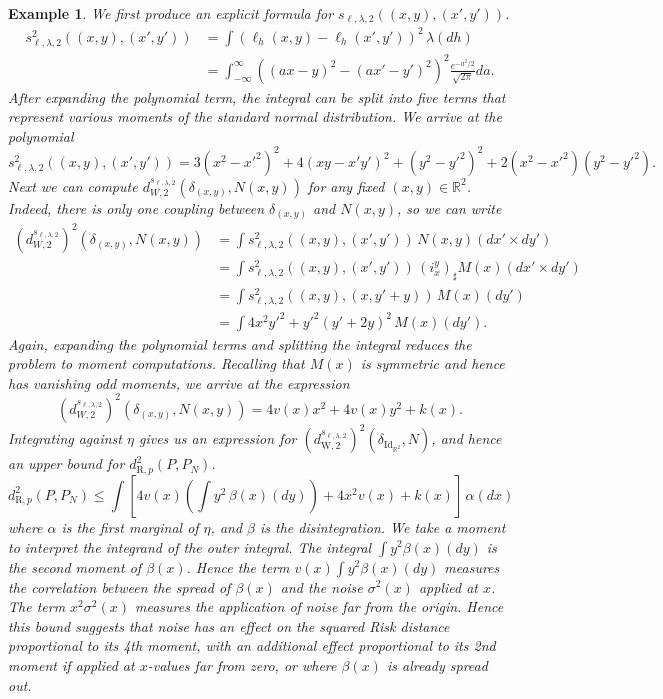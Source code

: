 \documentclass[twoside,11pt]{article}
\newtheorem{examples}[theorem]{Example}
\DeclareMathOperator{\id}{Id}
\newcommand{\dexp}[1][]{d_{\mathrm{R}#1}}
\newcommand{\dWkernp}[1]{d_{\mathrm{W},#1}}
\begin{document}
\begin{examples}
    We first produce an explicit formula for $s_{\ell,\lambda,2}((x,y),(x',y'))$.
    \begin{align*}
    s_{\ell,\lambda,2}^2((x,y),(x',y'))
    & =
    \int\left(
        \ell_h(x,y) - \ell_h(x',y')
    \right)^2 \, \lambda(dh)
    \\ & =
    \int_{-\infty}^\infty\left(
        (ax-y)^2 - (ax'-y')^2
    \right)^2 \frac{e^{-a^2/2}}{\sqrt{2\pi}} da.
    \end{align*}
    After expanding the polynomial term, the integral can be split into five terms that represent various moments of the standard normal distribution. We arrive at the polynomial
    \[
    s_{\ell,\lambda,2}^2((x,y),(x',y')) = 3(x^2-x'^2)^2 + 4(xy-x'y')^2 + (y^2-y'^2)^2 + 2(x^2-x'^2)(y^2-y'^2).
    \]
    Next we can compute $d_{W,2}^{s_{\ell,\lambda,2}}(\delta_{(x,y)}, N(x,y))$ for any fixed $(x,y) \in \mathbb R^2$. Indeed, there is only one coupling between $\delta_{(x,y)}$ and  $N(x,y)$, so we can write
    \begin{align*}
    \left(d_{W,2}^{s_{\ell,\lambda,2}}\right)^2(\delta_{(x,y)}, N(x,y))
    & =
    \int s_{\ell,\lambda,2}^2((x,y),(x',y'))\, N(x,y)(dx'{\times}dy')
    \\ & =
    \int s_{\ell,\lambda,2}^2((x,y),(x',y'))\, (i_x^y)_\sharp M(x)(dx'{\times}dy')
    \\ & =
    \int s_{\ell,\lambda,2}^2((x,y),(x,y'+y))\, M(x)(dy')
    \\ & =
    \int 4x^2y'^2 + y'^2(y'+2y)^2\, M(x)(dy').
    \end{align*}
    Again, expanding the polynomial terms and splitting the integral reduces the problem to moment computations. Recalling that $M(x)$ is symmetric and hence has vanishing odd moments, we arrive at the expression
    \[
    \left(d_{W,2}^{s_{\ell,\lambda,2}}\right)^2(\delta_{(x,y)}, N(x,y)) = 4v(x)x^2+ 4v(x)y^2 + k(x).
    \]
    Integrating against $\eta$ gives us an expression for $\left(\dWkernp{2}^{s_{\ell,\lambda,2}}\right)^2(\delta_{\id_{\mathbb R^2}},N)$, and hence an upper bound for $\dexp[,p]^2(P,P_N)$.
    \[
    \dexp[,p]^2(P,P_N) \leq \int \left[4 v(x) \left(\int y^2 \, \beta(x)(dy)\right)  + 4 x^2v(x) + k(x) \right]\, \alpha(dx)
    \]
    where $\alpha$ is the first marginal of $\eta$, and $\beta$ is the disintegration. We take a moment to interpret the integrand of the outer integral. The integral $\int y^2 \beta(x)(dy)$ is the second moment of $\beta(x)$. Hence the term $v(x)\int y^2 \beta(x)(dy)$ measures the correlation between the spread of $\beta(x)$ and the noise $\sigma^2(x)$ applied at $x$. The term $x^2 \sigma^2(x)$ measures the application of noise far from the origin. Hence this bound suggests that noise has an effect on the squared Risk distance proportional to its 4th moment, with an additional effect proportional to its 2nd moment if applied at $x$-values far from zero, or where $\beta(x)$ is already spread out.
\end{examples}
\end{document}
